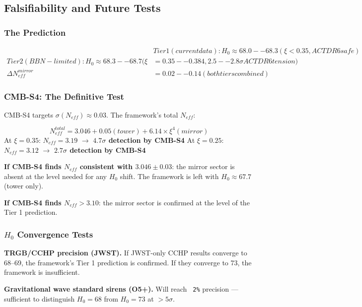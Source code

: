 \documentclass[aps,prd,preprint,superscriptaddress,longbibliography,floatfix]{revtex4-2}
\theoremstyle{remark}
\begin{document}
\subsection{Falsifiability and Future Tests}


\subsubsection{The Prediction}


\begin{align}
    & Tier 1 (current data):    H_{0} \approx 68.0--68.3   (\xi < 0.35, ACT DR6 safe) \\
    Tier 2 (BBN-limited):     H_{0} \approx 68.3--68.7   (\xi &= 0.35--0.384, 2.5--2.8\sigma ACT DR6 tension) \\
    \Delta N_{eff}^{mirror} &= 0.02--0.14   (both tiers combined)
\end{align}

\subsubsection{CMB-S4: The Definitive Test}

CMB-S4 targets $\sigma(N_{eff}) \approx 0.03$. The framework's total $N_{eff}$:


\begin{equation}
    N_{eff}^{total} = 3.046 + 0.05 (tower) + 6.14 \times \xi^{4} (mirror)
\end{equation}
At $\xi = 0.35$: $N_{eff} = 3.19$ $\to$ \textbf{$4.7\sigma$ detection by CMB-S4} At $\xi = 0.25$: $N_{eff} = 3.12$ $\to$ \textbf{$2.7\sigma$ detection by CMB-S4}

\textbf{If CMB-S4 finds $N_{eff}$ consistent with $3.046 \pm 0.03$}: the mirror sector is absent at the level needed for any $H_{0}$ shift. The framework is left with $H_{0} \approx 67.7$ (tower only).

\textbf{If CMB-S4 finds $N_{eff} > 3.10$}: the mirror sector is confirmed at the level of the Tier 1 prediction.


\subsubsection{$H_{0}$ Convergence Tests}

\textbf{TRGB/CCHP precision (JWST).} If JWST-only CCHP results converge to 68--69, the framework's Tier 1 prediction is confirmed. If they converge to 73, the framework is insufficient.

\textbf{Gravitational wave standard sirens (O5+).} Will reach \texttt{~2\%} precision --- sufficient to distinguish $H_{0} = 68$ from $H_{0} = 73$ at $>5\sigma$.
\end{document}
